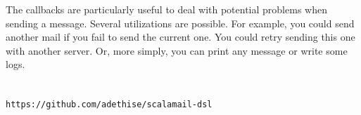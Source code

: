 \documentclass[10pt,a4paper]{article}
\begin{document}
	The callbacks are particularly useful to deal with potential problems when sending a message. Several utilizations are possible. For example, you could send another mail if you fail to send the current one. You could retry sending this one with another server. Or, more simply, you can print any message or write some logs.
	

\section*{}
 \texttt{https://github.com/adethise/scalamail-dsl}

	
\end{document}
